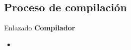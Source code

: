 
\subsection{Proceso de compilación}

\begin{frame}[fragile]{Enlazado}
\textbf{Compilador}
  \begin{itemize}[<+(1)->]
  \item
 \end{itemize}
\end{frame}